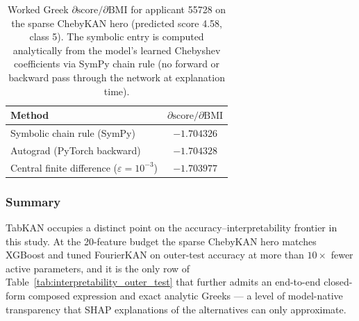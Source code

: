 \begin{table}[H]
\centering
\caption{Worked Greek $\partial\text{score}/\partial\text{BMI}$ for applicant 55728 on the sparse ChebyKAN hero (predicted score 4.58, class 5). The symbolic entry is computed analytically from the model's learned Chebyshev coefficients via SymPy chain rule (no forward or backward pass through the network at explanation time).}
\label{tab:worked_greek}
\footnotesize
\begin{tabular}{lc}
\hline
Method & $\partial\text{score}/\partial\text{BMI}$ \\
\hline
Symbolic chain rule (SymPy)                  & $-1.704326$ \\
Autograd (PyTorch backward)                  & $-1.704328$ \\
Central finite difference ($\varepsilon = 10^{-3}$) & $-1.703977$ \\
\hline
\end{tabular}
\end{table}

\subsubsection{Summary}

TabKAN occupies a distinct point on the accuracy--interpretability
frontier in this study. At the 20-feature budget the sparse ChebyKAN
hero matches XGBoost and tuned FourierKAN on outer-test accuracy at
more than $10\times$ fewer active parameters, and it is the only
row of Table~\ref{tab:interpretability_outer_test} that further
admits an end-to-end closed-form composed expression and exact
analytic Greeks --- a level of model-native transparency that SHAP
explanations of the alternatives can only approximate.
